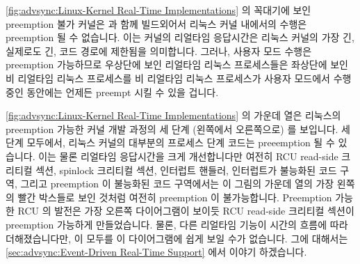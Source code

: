 \cref{fig:advsync:Linux-Kernel Real-Time Implementations}
의 꼭대기에 보인 preemption 불가 커널은  과 함께
빌드외어서 리눅스 커널 내에서의 수행은 preemption 될 수 없습니다.
이는 커널의 리얼타임 응답시간은 리눅스 커널의 가장 긴, 실제로도 긴, 코드 경로에
제한됨을 의미합니다.
그러나, 사용자 모드 수행은 preemption 가능하므로 우상단에 보인 리얼타임 리눅스
프로세스들은 좌상단에 보인 비 리얼타임 리눅스 프로세스를 비 리얼타임 리눅스
프로세스가 사용자 모드에서 수행중인 동안에는 언제든 preempt 시킬 수 있을
겁니다.

\cref{fig:advsync:Linux-Kernel Real-Time Implementations}
의 가운데 열은 리눅스의 preemption 가능한 커널 개발 과정의 세 단계 (왼쪽에서
오른쪽으로) 를 보입니다.
세 단계 모두에서, 리눅스 커널의 대부분의 프로세스 단계 코드는 preeemption 될 수
있습니다.
이는 물론 리얼타임 응답시간을 크게 개선합니다만 여전히 RCU read-side 크리티컬
섹션, spinlock 크리티컬 섹션, 인터럽트 핸들러, 인터럽트가 불능화된 코드 구역,
그리고 preemption 이 불능화된 코드 구역에서는 이 그림의 가운데 열의 가장 왼쪽의
빨간 박스들로 보인 것처럼 여전히 preemption 이 불가능합니다.
Preemption 가능한 RCU 의 발전은 가장 오른쪽 다이어그램이 보이듯 RCU read-side
크리티컬 섹션이 preemption 가능하게 만들었습니다.
물론, 다른 리얼타임 기능이 시간의 흐름에 따라 더해졌습니다만, 이 모두를 이
다이어그램에 쉽게 보일 수가 없습니다.
그에 대해서는
\cref{sec:advsync:Event-Driven Real-Time Support} 에서 이야기 하겠습니다.

